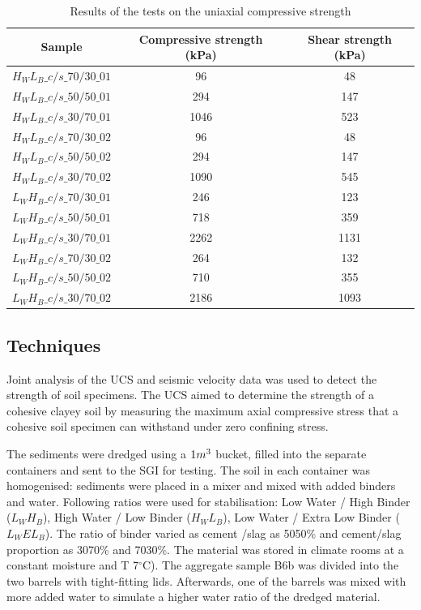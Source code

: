 \documentclass[10pt,twoside,twocolumn,a4paper]{article}
\begin{document}
\begin{table}
\centering
\caption{Results of the tests on the uniaxial compressive strength}
\label{tab:1}
\setlength\tabcolsep{0pt} 
\smallskip 
\begin{tabular*}{\columnwidth}{@{\extracolsep{\fill}}ccc}
\toprule
Sample & Compressive strength (kPa) & Shear strength (kPa) \\
\toprule
$H_WL_B\_c/s\_70/30\_01$ & 96 & 48 \\ 
\hline
$H_WL_B\_c/s\_50/50\_01$ & 294 & 147 \\
\hline
$H_WL_B\_c/s\_30/70\_01$ & 1046 & 523 \\
\hline
$H_WL_B\_c/s\_70/30\_02$ & 96 & 48 \\
\hline
$H_WL_B\_c/s\_50/50\_02$ & 294 & 147 \\
\hline
$H_WL_B\_c/s\_30/70\_02$ & 1090 & 545 \\
\hline
$L_WH_B\_c/s\_70/30\_01$ & 246 & 123 \\
\hline
$L_WH_B\_c/s\_50/50\_01$ & 718 & 359 \\
\hline
$L_WH_B\_c/s\_30/70\_01$ & 2262 & 1131 \\
\hline
$L_WH_B\_c/s\_70/30\_02$ & 264 & 132 \\
\hline
$L_WH_B\_c/s\_50/50\_02$ & 710 & 355 \\
\hline
$L_WH_B\_c/s\_30/70\_02$ & 2186 & 1093 \\
\midrule
\bottomrule
\end{tabular*}
\end{table}

\subsection{Techniques}
Joint analysis of the UCS and seismic velocity data was used to detect the strength of soil specimens. The UCS aimed to determine the strength of a cohesive clayey soil by measuring the maximum axial compressive stress that a cohesive soil specimen can withstand under zero confining stress.

The sediments were dredged using a $1\space m^3$ bucket, filled into the separate containers and sent to the SGI for testing. The soil in each container was homogenised: sediments were placed in a mixer and mixed with added binders and water. Following ratios were used for stabilisation: Low Water / High Binder ($L_WH_B$), High Water / Low Binder ($H_WL_B$), Low Water / Extra Low Binder ($L_WEL_B$). The ratio of binder varied as cement /slag as 50\/50\% and cement/slag proportion as 30\/70\% and 70\/30\%. The material was stored in climate rooms at a constant moisture and T 7$^{\circ}$C). The aggregate sample B6b was divided into the two barrels with tight-fitting lids. Afterwards, one of the barrels was mixed with more added water to simulate a higher water ratio of the dredged material.  
\end{document}
